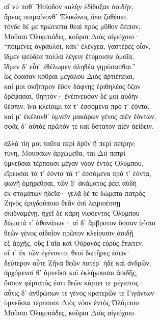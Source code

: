 \quad{}αἵ νύ ποθ' Ἡσίοδον καλὴν ἐδίδαξαν ἀοιδήν,\\
ἄρνας ποιμαίνονθ' Ἑλικῶνος ὕπο ζαθέοιο.\\
τόνδε δέ με πρώτιστα θεαὶ πρὸς μῦθον ἔειπον,\\
Μοῦσαι Ὀλυμπιάδες, κοῦραι Διὸς αἰγιόχοιο·  \\
``ποιμένες ἄγραυλοι, κάκ' ἐλέγχεα, γαστέρες οἶον,\\
ἴδμεν ψεύδεα πολλὰ λέγειν ἐτύμοισιν ὁμοῖα,\\
ἴδμεν δ' εὖτ' ἐθέλωμεν ἀληθέα γηρύσασθαι.''\\
ὣς ἔφασαν κοῦραι μεγάλου Διὸς ἀρτιέπειαι,\\
καί μοι σκῆπτρον ἔδον δάφνης ἐριθηλέος ὄζον \\
δρέψασαι, θηητόν· ἐνέπνευσαν δέ μοι αὐδὴν \\
θέσπιν, ἵνα κλείοιμι τά τ' ἐσσόμενα πρό τ' ἐόντα, \\
καί μ' ἐκέλονθ' ὑμνεῖν μακάρων γένος αἰὲν ἐόντων,\\
σφᾶς δ' αὐτὰς πρῶτόν τε καὶ ὕστατον αἰὲν ἀείδειν.

\quad{}ἀλλὰ τίη μοι ταῦτα περὶ δρῦν ἢ περὶ πέτρην;  \\
τύνη, Μουσάων ἀρχώμεθα, ταὶ Διὶ πατρὶ\\
ὑμνεῦσαι τέρπουσι μέγαν νόον ἐντὸς Ὀλύμπου,\\
εἴρευσαι τά τ' ἐόντα τά τ' ἐσσόμενα πρό τ' ἐόντα,\\
φωνῇ ὁμηρεῦσαι, τῶν δ' ἀκάματος ῥέει αὐδὴ \\
ἐκ στομάτων ἡδεῖα· γελᾷ δέ τε δώματα πατρὸς  \\
Ζηνὸς ἐριγδούποιο θεᾶν ὀπὶ λειριοέσσῃ\\
σκιδναμένῃ, ἠχεῖ δὲ κάρη νιφόεντος Ὀλύμπου \\
δώματά τ' ἀθανάτων· αἱ δ' ἄμβροτον ὄσσαν ἱεῖσαι \\
θεῶν γένος αἰδοῖον πρῶτον κλείουσιν ἀοιδῇ\\
ἐξ ἀρχῆς, οὓς Γαῖα καὶ Οὐρανὸς εὐρὺς ἔτικτεν, \\
οἵ τ' ἐκ τῶν ἐγένοντο, θεοὶ δωτῆρες ἐάων· \\
δεύτερον αὖτε Ζῆνα θεῶν πατέρ' ἠδὲ καὶ ἀνδρῶν, \\
ἀρχόμεναί θ' ὑμνεῦσι καὶ ἐκλήγουσαι ἀοιδῆς,\\
ὅσσον φέρτατός ἐστι θεῶν κάρτει τε μέγιστος·\\
αὖτις δ' ἀνθρώπων τε γένος κρατερῶν τε Γιγάντων \\
ὑμνεῦσαι τέρπουσι Διὸς νόον ἐντὸς Ὀλύμπου\\
Μοῦσαι Ὀλυμπιάδες, κοῦραι Διὸς αἰγιόχοιο.

